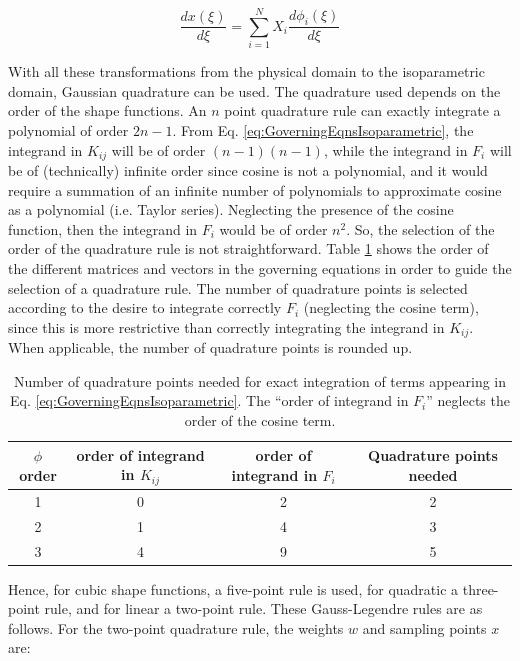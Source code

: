 \documentclass[10pt]{article}
\begin{document}
\begin{equation}
\frac{dx(\xi)}{d\xi}=\sum_{i=1}^{N} X_i\frac{d\phi_i(\xi)}{d\xi}
\end{equation}

With all these transformations from the physical domain to the isoparametric domain, Gaussian quadrature can be used. The quadrature used depends on the order of the shape functions. An \(n\) point quadrature rule can exactly integrate a polynomial of order \(2n-1\). From Eq. \eqref{eq:GoverningEqnsIsoparametric}, the integrand in \(K_{ij}\) will be of order \((n-1)(n-1)\), while the integrand in \(F_i\) will be of (technically) infinite order since cosine is not a polynomial, and it would require a summation of an infinite number of polynomials to approximate cosine as a polynomial (i.e. Taylor series). Neglecting the presence of the cosine function, then the integrand in \(F_i\) would be of order \(n^2\). So, the selection of the order of the quadrature rule is not straightforward. Table \ref{table:orders} shows the order of the different matrices and vectors in the governing equations in order to guide the selection of a quadrature rule. The number of quadrature points is selected according to the desire to integrate correctly \(F_{i}\) (neglecting the cosine term), since this is more restrictive than correctly integrating the integrand in \(K_{ij}\). When applicable, the number of quadrature points is rounded up. 

\begin{table}[H]
\caption{Number of quadrature points needed for exact integration of terms appearing in Eq. \eqref{eq:GoverningEqnsIsoparametric}. The ``order of integrand in \(F_i\)'' neglects the order of the cosine term.}
\centering
\begin{tabular}{c c c c}
\hline\hline
\(\phi\) order & order of integrand in \(K_{ij}\) & order of integrand in \(F_{i}\) & Quadrature points needed\\ [0.5ex]
\hline
1 & 0 & 2 & 2\\
2 & 1 & 4 & 3\\
3 & 4 & 9 & 5\\
\hline
\end{tabular}
\label{table:orders}
\end{table}

Hence, for cubic shape functions, a five-point rule is used, for quadratic a three-point rule, and for linear a two-point rule. These Gauss-Legendre rules are as follows. For the two-point quadrature rule, the weights \(w\) and sampling points \(x\) are:
\end{document}
